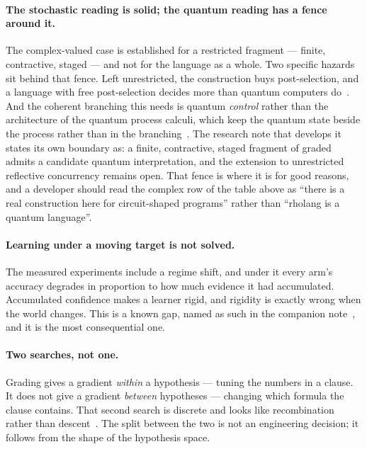 \paragraph{The stochastic reading is solid; the quantum reading has a fence
around it.} The complex-valued case is established for a restricted fragment ---
finite, contractive, staged --- and not for the language as a whole. Two
specific hazards sit behind that fence. Left unrestricted, the construction
buys post-selection, and a language with free post-selection decides more than
quantum computers do~\cite{Aaronson05}. And the coherent branching this needs
is quantum \emph{control} rather than the architecture of the quantum process
calculi, which keep the quantum state beside the process rather than in the
branching~\cite{GayNagarajan05,YingYuFeng14,BadescuPanangaden15}. The
research note that develops it~\cite{GWQuantum} states its own boundary as: a finite, contractive,
staged fragment of graded \rhoc{} admits a candidate quantum interpretation, and
the extension to unrestricted reflective concurrency remains open. That fence is
where it is for good reasons, and a developer should read the complex row of the
table above as ``there is a real construction here for circuit-shaped programs''
rather than ``rholang is a quantum language''.

\paragraph{Learning under a moving target is not solved.} The measured
experiments include a regime shift, and under it every arm's accuracy degrades
in proportion to how much evidence it had accumulated. Accumulated confidence
makes a learner rigid, and rigidity is exactly wrong when the world changes.
This is a known gap, named as such in the companion note~\cite{GWPLN}, and it is the most
consequential one.

\paragraph{Two searches, not one.} Grading gives a gradient \emph{within} a
hypothesis --- tuning the numbers in a clause. It does not give a gradient
\emph{between} hypotheses --- changing which formula the clause contains. That
second search is discrete and looks like recombination rather than
descent~\cite{ComposeNote}. The
split between the two is not an engineering decision; it follows from the shape
of the hypothesis space.
